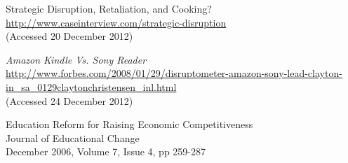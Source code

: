 \documentclass[a4paper,10pt]{article}
\begin{document}
\begin{thebibliography}{9}
Strategic Disruption, Retaliation, and Cooking? \\
\url{http://www.caseinterview.com/strategic-disruption}\\
(Accessed 20 December 2012)

  \emph{Amazon Kindle Vs. Sony Reader} \\
  \url{http://www.forbes.com/2008/01/29/disruptometer-amazon-sony-lead-clayton-in_sa_0129claytonchristensen_inl.html}\\
 (Accessed 24 December 2012)


Education Reform for Raising Economic Competitiveness\\
Journal of Educational Change\\
December 2006, Volume 7, Issue 4, pp 259-287\\

\end{thebibliography}
\end{document}
